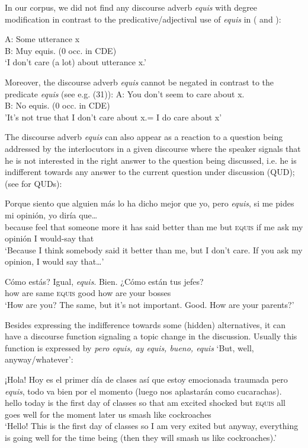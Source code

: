 \documentclass[output=paper
,modfonts
,nonflat]{langsci/langscibook}
\begin{document}
In our corpus, we did not find any discourse adverb \textit{equis} with degree modification in contrast to the predicative/adjectival use of \textit{equis} in ( and ):

\ea
\gll A: Some utterance x \\
B: Muy equis. (0 occ. in CDE)\\
\glt ‘I don’t care (a lot) about utterance x.’
\z

Moreover, the discourse adverb \textit{equis} cannot be negated in contrast to the predicate \textit{equis} (see e.g. (31)):
\ea
\gll A: You don't seem to care about x. \\
B: No equis. (0 occ. in CDE)\\
\glt 'It's not true that I don't care about x.= I do care about x'
\z

The discourse adverb \textit{equis} can also appear as a reaction to a question being addressed by the interlocutors in a given discourse where the speaker signals that he is not interested in the right answer to the question being discussed, i.e. he is indifferent towards any answer to the current question under discussion (QUD); (see \citealt{Roberts1996} for QUDs):

\ea
\gll Porque siento que alguien más lo ha dicho mejor que yo, pero \textit{equis}, si me pides mi opinión, yo diría que…\\
because feel that someone more it has said better than me but \textsc{equis}	if me ask my opinión I would-say that\\
\glt ‘Because I think somebody said it better than me, but I don’t care. If you ask my opinion, I would say that…’
\z

\ea
{}Cómo	estás? Igual, \textit{equis}. Bien. {¿}Cómo están tus jefes?\\
how are same \textsc{equis} good how are your bosses\\
\glt ‘How are you? The same, but it’s not important. Good. How are your parents?’
\z

Besides expressing the indifference towards some (hidden) alternatives, it can have a discourse function signaling a topic change in the discussion. Usually this function is expressed by \textit{pero equis, ay equis, bueno, equis} ‘But, well, anyway/whatever’:

\ea
\gll ¡Hola! Hoy es el primer día de clases así que estoy emocionada traumada pero \textit{equis}, todo va bien por el momento (luego nos aplastarán como cucarachas).\\
hello today is the first day of classes so that am excited shocked but \textsc{equis} all goes well for the moment later us smash like cockroaches\\
\glt ‘Hello! This is the first day of classes so I am very exited but anyway, everything is going well for the time being (then they will smash us like cockroaches).’
\z
\end{document}
